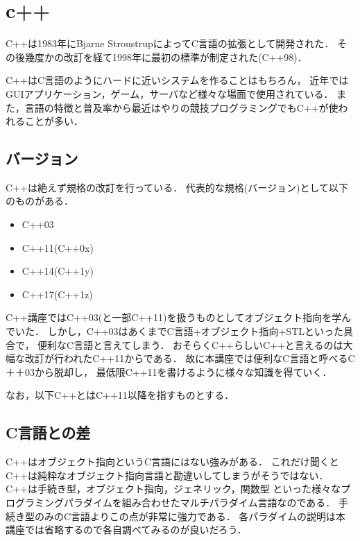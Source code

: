 
\section{c++}
C++は1983年にBjarne StroustrupによってC言語の拡張として開発された．
その後幾度かの改訂を経て1998年に最初の標準が制定された(C++98)．

C++はC言語のようにハードに近いシステムを作ることはもちろん，
近年ではGUIアプリケーション，ゲーム，サーバなど様々な場面で使用されている．
また，言語の特徴と普及率から最近はやりの競技プログラミングでもC++が使われることが多い．


\subsection{バージョン}
C++は絶えず規格の改訂を行っている．
代表的な規格(バージョン)として以下のものがある．
\begin{itemize}
    \item C++03
    \item C++11(C++0x)
    \item C++14(C++1y)
    \item C++17(C++1z)
\end{itemize}

C++講座ではC++03(と一部C++11)を扱うものとしてオブジェクト指向を学んでいた．
しかし，C++03はあくまでC言語+オブジェクト指向+STLといった具合で，
便利なC言語と言えてしまう．
おそらくC++らしいC++と言えるのは大幅な改訂が行われたC++11からである．
故に本講座では便利なC言語と呼べるC＋＋03から脱却し，
最低限C++11を書けるように様々な知識を得ていく．

なお，以下C++とはC++11以降を指すものとする．

\subsection{C言語との差}
C++はオブジェクト指向というC言語にはない強みがある．
これだけ聞くとC++は純粋なオブジェクト指向言語と勘違いしてしまうがそうではない．
C++は手続き型，オブジェクト指向，ジェネリック，関数型
といった様々なプログラミングパラダイムを組み合わせたマルチパラダイム言語なのである．
手続き型のみのC言語よりこの点が非常に強力である．
各パラダイムの説明は本講座では省略するので各自調べてみるのが良いだろう．

